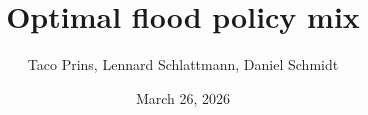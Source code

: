 
\usepackage{remreset}%
\makeatletter
{}
\beamer@compresstrue					%
\makeatother
\setcounter{subsection}{1}

\newcommand{\themename}{\textbf{\textsc{metropolis}}\xspace}
\newcommand*{\captionsource}[2]{\caption[{#1}]{#1\hspace{\linewidth}\textbf{Source:
		}#2}}


\renewcommand{\bibsection}{}

\makeatletter
\newcommand*\rel@kern[1]{\kern#1\dimexpr\macc@kerna}
\newcommand*\widebar[1]{%
	\begingroup
	\def\mathaccent##1##2{%
		\rel@kern{0.8}%
		\overline{\rel@kern{-0.8}\macc@nucleus\rel@kern{0.2}}%
		\rel@kern{-0.2}%
	}%
	\macc@depth\@ne
	\let\math@bgroup\@empty \let\math@egroup\macc@set@skewchar
	\mathsurround\z@ \frozen@everymath{\mathgroup\macc@group\relax}%
	\macc@set@skewchar\relax
	\let\mathaccentV\macc@nested@a
	\macc@nested@a\relax111{#1}%
	\endgroup
}
\makeatother

\graphicspath{{figures/}}

\title{Optimal flood policy mix}

\date{March 26, 2026}
\author{Taco Prins, Lennard Schlattmann, Daniel Schmidt}

